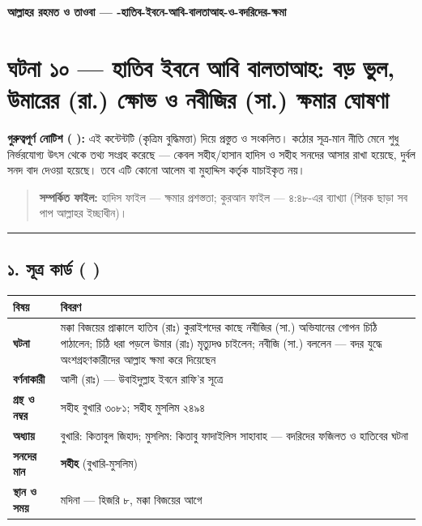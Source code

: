 

\begin{center}{\Large\bfseries\color{emerald} আল্লাহর রহমত ও তাওবা — -হাতিব-ইবনে-আবি-বালতাআহ-ও-বদরিদের-ক্ষমা}\end{center}
\vspace{1em}
\section*{ঘটনা ১০ — হাতিব ইবনে আবি বালতাআহ: বড় ভুল, উমারের (রা.) ক্ষোভ ও নবীজির (সা.) ক্ষমার ঘোষণা}

\begin{warnbox}
 \textbf{গুরুত্বপূর্ণ নোটিশ ( ):} এই কন্টেন্টটি  (কৃত্রিম বুদ্ধিমত্তা) দিয়ে প্রস্তুত ও সংকলিত।  কঠোর সূত্র-মান নীতি মেনে শুধু নির্ভরযোগ্য উৎস থেকে তথ্য সংগ্রহ করেছে — কেবল সহীহ/হাসান হাদিস ও সহীহ সনদের আসার রাখা হয়েছে, দুর্বল সনদ বাদ দেওয়া হয়েছে। তবে এটি কোনো আলেম বা মুহাদ্দিস কর্তৃক যাচাইকৃত নয়।
\end{warnbox}

\begin{quote}
\textbf{সম্পর্কিত ফাইল:} হাদিস ফাইল — ক্ষমার প্রশস্ততা; কুরআন ফাইল — ৪:৪৮-এর ব্যাখ্যা (শিরক ছাড়া সব পাপ আল্লাহর ইচ্ছাধীন)।
\end{quote}

\medskip\hrule\medskip

\subsection*{১. সূত্র কার্ড ( )}

\begin{table}[h]\centering\small
\begin{tabular}{ll}
বিষয় & বিবরণ \\
\hline
\textbf{ঘটনা} & মক্কা বিজয়ের প্রাক্কালে হাতিব (রাঃ) কুরাইশদের কাছে নবীজির (সা.) অভিযানের গোপন চিঠি পাঠালেন; চিঠি ধরা পড়লে উমার (রাঃ) মৃত্যুদণ্ড চাইলেন; নবীজি (সা.) বললেন — বদর যুদ্ধে অংশগ্রহণকারীদের আল্লাহ ক্ষমা করে দিয়েছেন \\
\textbf{বর্ণনাকারী} & আলী (রাঃ) — উবাইদুল্লাহ ইবনে রাফি'র সূত্রে \\
\textbf{গ্রন্থ ও নম্বর} & সহীহ বুখারি ৩০৮১; সহীহ মুসলিম ২৪৯৪ \\
\textbf{অধ্যায়} & বুখারি: কিতাবুল জিহাদ; মুসলিম: কিতাবু ফাদাইলিস সাহাবাহ — \lat{“}বদরিদের ফজিলত ও হাতিবের ঘটনা\lat{”} \\
\textbf{সনদের মান} & \textbf{সহীহ} (বুখারি-মুসলিম) \\
\textbf{স্থান ও সময়} & মদিনা — হিজরি ৮, মক্কা বিজয়ের আগে \\
\hline
\end{tabular}
\end{table}


